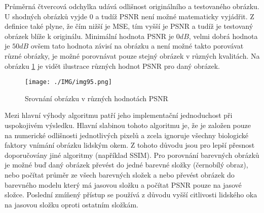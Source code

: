 \documentclass[thesis=M,czech]{FITthesis}[2016/06/26]
\begin{document}
Průměrná čtvercová odchylka udává odlišnost originálního a testovaného obrázku. U shodných obrázků vyjde 0 a tudíž PSNR není možné matematicky vyjádřit. Z definice také plyne, že čím nižší je MSE, tím vyšší je PSNR a tudíž je testovaný obrázek blíže k originálu. Minimální hodnota PSNR je $0\mathit{dB}$, velmi dobrá hodnota je $50\mathit{dB}$\cite{50PSNR} ovšem tato hodnota závisí na obrázku a není možné takto porovávat různé obrázky, je možné porovnávat pouze stejný obrázek v různých kvalitách\cite{PSNR3}. Na obrázku \ref{fig:PSNR_image} je vidět ilustrace různých hodnot PSNR pro daný obrázek. 
\begin{figure}[h]\centering
\texttt{[image: ./IMG/img95.png]}
\caption{Srovnání obrázku v různých hodnotách PSNR}
\label{fig:PSNR_image}
\end{figure}

Mezi hlavní výhody algoritmu patří jeho implementační jednoduchost při uspokojivém výsledku. Hlavní slabinou tohoto algoritmu je, že je založen pouze na numerické odlišnosti jednotlivých pixelů a zcela ignoruje všechny biologické faktory vnímání obrázku lidským okem.  Z tohoto důvodu jsou pro lepší přesnost doporučovány jiné algoritmy (například SSIM). Pro porovnání barevných obrázků je možné buď daný obrázek převést do jedné barevné složky (černobílý obraz), nebo počítat průměr ze všech barevných složek a nebo převést obrázek do barevného modelu který má jasovou složku a počítat PSNR pouze na jasové složce. Poslední zmíňený přístup se používá z důvodu vyšší citlivosti lidského oka na jasovou složku oproti ostatním složkám.
\end{document}
